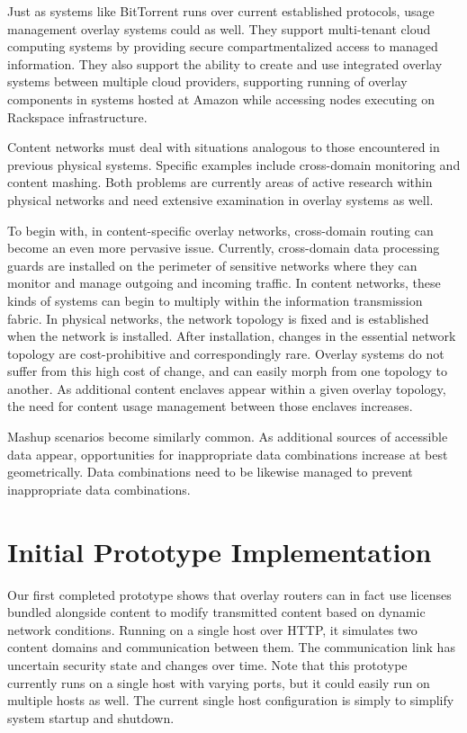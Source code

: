 Just as systems like BitTorrent runs over current established protocols, usage management overlay systems could as well.  They support multi-tenant cloud computing systems by providing secure compartmentalized access to managed information.  They also support the ability to create and use integrated overlay systems between multiple cloud providers, supporting running of overlay components in systems hosted at Amazon while accessing nodes executing on Rackspace infrastructure.

Content networks must deal with situations analogous to those encountered in previous physical systems.  Specific examples include cross-domain monitoring and content mashing.  Both problems are currently areas of active research within physical networks and need extensive examination in overlay systems as well.

To begin with, in content-specific overlay networks, cross-domain routing can become an even more pervasive issue.  Currently, cross-domain data processing guards are installed on the perimeter of sensitive networks where they can monitor and manage outgoing and incoming traffic.  In content networks, these kinds of systems can begin to multiply within the information transmission fabric.  In physical networks, the network topology is fixed and is established when the network is installed.  After installation, changes in the essential network topology are cost-prohibitive and correspondingly rare.  Overlay systems do not suffer from this high cost of change, and can easily morph from one topology to another.  As additional content enclaves appear within a given overlay topology, the need for content usage management between those enclaves increases.

Mashup scenarios become similarly common.  As additional sources of accessible data appear, opportunities for inappropriate data combinations increase at best geometrically.  Data combinations need to be likewise managed to prevent inappropriate data combinations.

\section{Initial Prototype Implementation}
Our first completed prototype shows that overlay routers can in fact use licenses bundled alongside content to modify transmitted content based on dynamic network conditions.  Running on a single host over HTTP, it simulates two content domains and communication between them.  The communication link has uncertain security state and changes over time.  Note that this prototype currently runs on a single host with varying ports, but it could easily run on multiple hosts as well.  The current single host configuration is simply to simplify system startup and shutdown.

